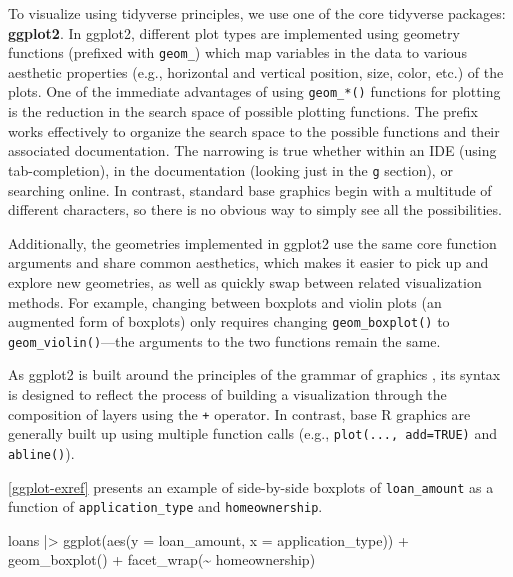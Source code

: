 \documentclass[12pt]{article}
\newenvironment{Shaded}{\begin{snugshade}}{\end{snugshade}}
\newcommand{\AttributeTok}[1]{\textcolor[rgb]{0.77,0.63,0.00}{#1}}
\newcommand{\FunctionTok}[1]{\textcolor[rgb]{0.00,0.00,0.00}{#1}}
\newcommand{\NormalTok}[1]{#1}
\newcommand{\SpecialCharTok}[1]{\textcolor[rgb]{0.00,0.00,0.00}{#1}}
\begin{document}
To visualize using tidyverse principles, we use one of the core
tidyverse packages: \textbf{ggplot2}. In ggplot2, different plot types
are implemented using geometry functions (prefixed with \texttt{geom\_})
which map variables in the data to various aesthetic properties (e.g.,
horizontal and vertical position, size, color, etc.) of the plots. One
of the immediate advantages of using \texttt{geom\_*()} functions for
plotting is the reduction in the search space of possible plotting
functions. The prefix works effectively to organize the search space to
the possible functions and their associated documentation. The narrowing
is true whether within an IDE (using tab-completion), in the
documentation (looking just in the \texttt{g} section), or searching
online. In contrast, standard base graphics begin with a multitude of
different characters, so there is no obvious way to simply see all the
possibilities.

Additionally, the geometries implemented in ggplot2 use the same core
function arguments and share common aesthetics, which makes it easier to
pick up and explore new geometries, as well as quickly swap between
related visualization methods. For example, changing between boxplots
and violin plots (an augmented form of boxplots) only requires changing
\texttt{geom\_boxplot()} to \texttt{geom\_violin()}---the arguments to
the two functions remain the same.

As ggplot2 is built around the principles of the grammar of graphics
\citep{wilkinson2012grammar}, its syntax is designed to reflect the
process of building a visualization through the composition of layers
using the \texttt{+} operator. In contrast, base R graphics are
generally built up using multiple function calls (e.g.,
\texttt{plot(...,\ add=TRUE)} and \texttt{abline()}).

\ref{ggplot-exref} presents an example of side-by-side boxplots of
\texttt{loan\_amount} as a function of \texttt{application\_type} and
\texttt{homeownership}.

\linespread{1}

\begin{Shaded}
\begin{Highlighting}[]
\NormalTok{loans }\SpecialCharTok{|\textgreater{}}
  \FunctionTok{ggplot}\NormalTok{(}\FunctionTok{aes}\NormalTok{(}\AttributeTok{y =}\NormalTok{ loan\_amount, }\AttributeTok{x =}\NormalTok{ application\_type)) }\SpecialCharTok{+}
  \FunctionTok{geom\_boxplot}\NormalTok{() }\SpecialCharTok{+}
  \FunctionTok{facet\_wrap}\NormalTok{(}\SpecialCharTok{\textasciitilde{}}\NormalTok{ homeownership)}
\end{Highlighting}
\end{Shaded}
\end{document}

